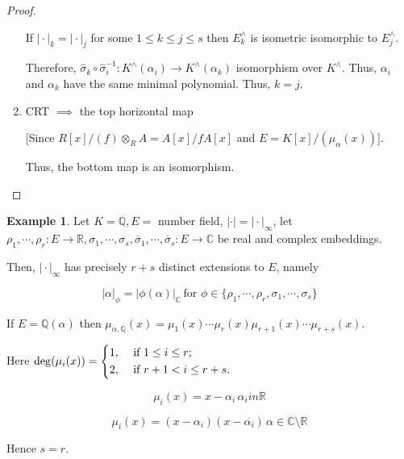 \documentclass[openany]{amsbook}
\numberwithin{section}{chapter}
\theoremstyle{definition}
\newtheorem*{example}{Example}
\begin{document}
\begin{proof}
\begin{enumerate}[label=\alph*)]
        If \(\vert \cdot \vert_k = \vert \cdot \vert_j\) for some \(1 \leq k \leq j \leq s\) then \(E_k^\wedge\) is isometric isomorphic to \(E_j^\wedge\).

        Therefore, \(\hat{\sigma}_k \circ \hat{\sigma}_i ^{-1} : K^\wedge(\alpha_i) \to K^\wedge(\alpha_k)\) isomorphism over \(K^\wedge\). Thus, \(\alpha_i\) and \(\alpha_k\) have the same minimal polynomial. Thus, \(k = j\).

        \item CRT \(\implies\) the top horizontal map
        
        \begin{center}
        \end{center}

        [Since \(R[x] / (f) \otimes_R A = A[x] / f A[x]\) and \(E = K[x] / (\mu_\alpha(x))\)].

        Thus, the bottom map is an isomorphism.

    \end{enumerate} 

\end{proof}

\begin{example}
    Let \(K = \mathbb{Q}, E =\) number field, \(\vert \cdot \vert = \vert \cdot \vert_\infty\), let \(\rho_1, \cdots , \rho_r : E \to \mathbb{R}, \sigma_1, \cdots , \sigma_s, \overline{\sigma}_1, \cdots , \overline{\sigma}_s : E \to \mathbb{C}\) be real and complex embeddings.

    Then, \(\vert \cdot \vert_\infty\) has precisely \(r + s\) distinct extensions to \(E\), namely

    \[
        \vert \alpha \vert _\phi = \vert \phi(\alpha) \vert_\mathbb{C} \, \text{for } \phi \in \{ \rho_1, \cdots , \rho_r, \sigma_1, \cdots , \sigma_s\} 
    \]

    If \(E = \mathbb{Q}(\alpha)\) then \(\mu_{\alpha, \mathbb{Q}}(x) = \mu_1(x) \cdots \mu_r(x) \mu_{r+1}(x) \cdots \mu_{r+s}(x)\).
    
    Here \(\deg(\mu_i(x)) = \begin{dcases}
        1, &\text{ if } 1 \leq i \leq r ;\\
        2, &\text{ if } r+1 <i \leq r+s.
    \end{dcases}\)  

    \[
        \mu_i(x) = x - \alpha_i \, \alpha_i in \mathbb{R}
    \]

    \[
        \mu_i(x) = (x-\alpha_i)(x-\overline{\alpha_i}) \, \alpha \in \mathbb{C} \setminus \mathbb{R}
    \]

    Hence \(s = r\). 
\end{example}
\end{document}
